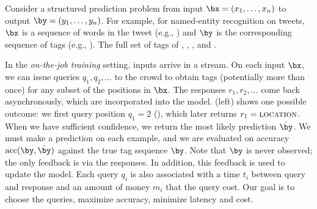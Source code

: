 Consider a structured prediction problem from input $\bx = (x_1, \dots, x_n)$ to output $\by = (y_1, \dots, y_n)$.
For example, for named-entity recognition on tweets,
$\bx$ is a sequence of words in the tweet (e.g., )
and $\by$ is the corresponding sequence of tags (e.g., \scnone{} \scloc{} \scloc{}).
The full set of tags of \scper{}, \scloc{}, \scres{}, and \scnone{}.

In the \emph{on-the-job training} setting,
inputs arrive in a stream.  On each input $\bx$,
we can issue queries $q_1, q_2, \dots$ to the crowd to obtain tags (potentially more than once)
for any subset of the positions in $\bx$.
The responses $r_1, r_2, \dots$ come back asynchronously,
which are incorporated into the model.
(left) shows one possible outcome:
we first query position $q_1 = 2$ (), which later returns $r_1 = \textsc{location}$.
When we have sufficient confidence, we return the most likely prediction $\hat \by$.
We must make a prediction on each example,
and we are evaluated on accuracy $\text{acc}(\by, \hat\by)$
against the true tag sequence $\by$.
Note that $\by$ is never observed; the only feedback is via the responses.
In addition, this feedback is used to update the model.
Each query $q_i$ is also associated with a time $t_i$ between query and response
and an amount of money $m_i$ that the query cost.
Our goal is to choose the queries, maximize accuracy, minimize latency and cost.



